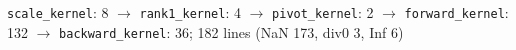 \texttt{scale\_kernel}: 8 $\to$ \texttt{rank1\_kernel}: 4 $\to$ \texttt{pivot\_kernel}: 2 $\to$ \texttt{forward\_kernel}: 132 $\to$ \texttt{backward\_kernel}: 36; 182 lines (NaN 173, div0 3, Inf 6)